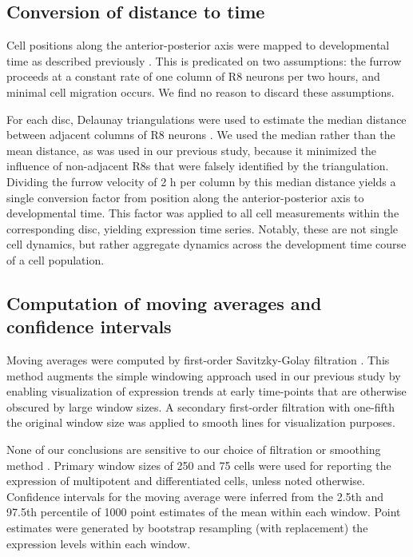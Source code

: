 \subsection{Conversion of distance to time}
\label{appendix:methods:ratio:distance_to_time}

Cell positions along the anterior-posterior axis were mapped to developmental time as described previously \cite{Pelaez2015a,Pelaez2016}. This is predicated on two assumptions: the furrow proceeds at a constant rate of one column of R8 neurons per two hours, and minimal cell migration occurs. We find no reason to discard these assumptions.

For each disc, Delaunay triangulations were used to estimate the median distance between adjacent columns of R8 neurons \cite{Fortune1992}. We used the median rather than the mean distance, as was used in our previous study, because it minimized the influence of non-adjacent R8s that were falsely identified by the triangulation. Dividing the furrow velocity of 2 h per column by this median distance yields a single conversion factor from position along the anterior-posterior axis to developmental time. This factor was applied to all cell measurements within the corresponding disc, yielding expression time series. Notably, these are not single cell dynamics, but rather aggregate dynamics across the development time course of a cell population.

\subsection{Computation of moving averages and confidence intervals}
\label{appendix:methods:ratio:moving_averages}

Moving averages were computed by first-order Savitzky-Golay filtration \cite{Savitzky1964}. This method augments the simple windowing approach used in our previous study \cite{Pelaez2015a} by enabling visualization of expression trends at early time-points that are otherwise obscured by large window sizes. A secondary first-order filtration with one-fifth the original window size was applied to smooth lines for visualization purposes.

None of our conclusions are sensitive to our choice of filtration or smoothing method \cite{Pelaez2015a}. Primary window sizes of 250 and 75 cells were used for reporting the expression of multipotent and differentiated cells, unless noted otherwise. Confidence intervals for the moving average were inferred from the 2.5th and 97.5th percentile of 1000 point estimates of the mean within each window. Point estimates were generated by bootstrap resampling (with replacement) the expression levels within each window.

